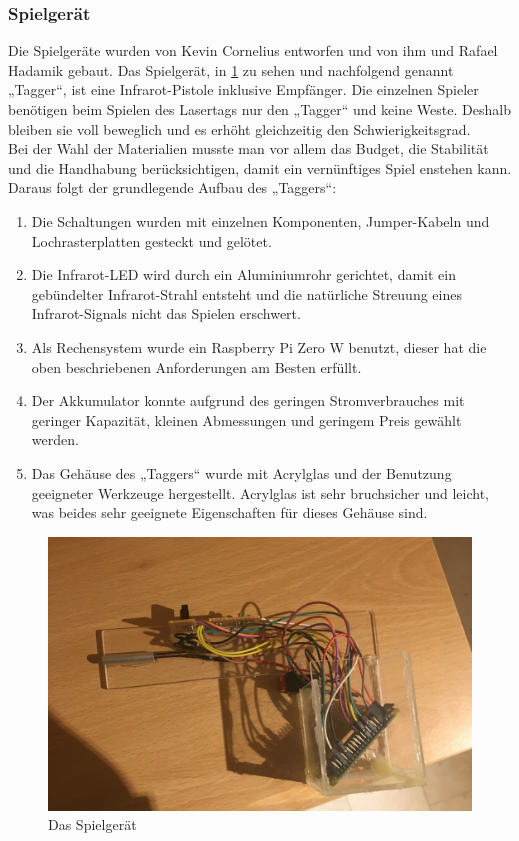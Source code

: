 \subsubsection{Spielgerät}
\label{sec:hardware-spielgeraet}

Die Spielgeräte wurden von Kevin Cornelius entworfen und von ihm und Rafael Hadamik gebaut.
Das Spielgerät, in \cref{fig:Bild1Hardware} zu sehen und nachfolgend genannt „Tagger“, ist eine Infrarot-Pistole inklusive Empfänger. Die einzelnen Spieler benötigen beim Spielen des Lasertags nur den „Tagger“ und keine Weste. Deshalb bleiben sie voll beweglich und es erhöht gleichzeitig den Schwierigkeitsgrad. \\
Bei der Wahl der Materialien musste man vor allem das Budget, die Stabilität und die Handhabung berücksichtigen, damit ein vernünftiges Spiel enstehen kann. Daraus folgt der grundlegende Aufbau des „Taggers“:
\begin{enumerate}
	\item Die Schaltungen wurden mit einzelnen Komponenten, Jumper-Kabeln und Lochrasterplatten gesteckt und gelötet.
	\item Die Infrarot-LED wird durch ein Aluminiumrohr gerichtet, damit ein gebündelter Infrarot-Strahl entsteht und die natürliche Streuung eines Infrarot-Signals nicht das Spielen erschwert.
	\item Als Rechensystem wurde ein Raspberry Pi Zero W benutzt, dieser  hat die oben beschriebenen Anforderungen am Besten erfüllt.
	\item Der Akkumulator konnte aufgrund des geringen Stromverbrauches mit geringer Kapazität, kleinen Abmessungen und geringem Preis gewählt werden.
	\item Das Gehäuse des „Taggers“ wurde mit Acrylglas und der Benutzung geeigneter Werkzeuge hergestellt. Acrylglas ist sehr bruchsicher und leicht, was beides sehr geeignete Eigenschaften für dieses Gehäuse sind.
\end{enumerate}
\begin{figure}[h]
	\centering
		\includegraphics[width=0.7 \textwidth]{./040-komponenten/010-hardware/tagger.jpg}
	\caption{Das Spielgerät}
	\label{fig:Bild1Hardware}
\end{figure}

